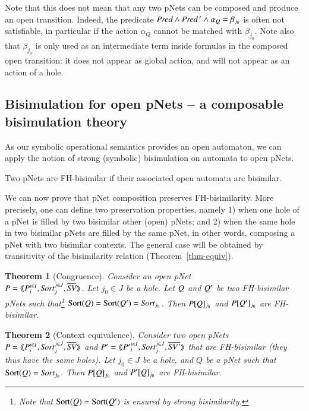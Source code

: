 \documentclass{elsarticle}
\newcommand{\TODO}[1]{\textcolor{red}{\textbf{[TODO:#1]}}}
\newtheorem{thm}{Theorem}
\begin{document}
Note that this does not mean that any two pNets can be composed and produce an open 
transition. Indeed, the predicate $\Pred\land\Pred\,'\land \alpha_Q=\beta_{j_0}$ is often not  satisfiable, in particular if the action  $\alpha_Q$ cannot be matched with $\beta_{j_0}$.
Note also that $\beta_{j_0}$ is  only used as an intermediate term inside formulas in the composed open transition: it 
does not appear as global action, and will not appear as an action of a hole.


\subsection{Bisimulation for open pNets -- a composable bisimulation theory}
\label{section:bisimulation-PN}
As  our symbolic operational semantics provides an open automaton, we can apply the notion of
	strong (symbolic) bisimulation on automata to open pNets.
\begin{definition}\label{def:bisim-pnets}
Two pNets are FH-bisimilar if their associated open automata are bisimilar.
\end{definition}

We can now prove that pNet composition  preserves
FH-bisimilarity. More precisely, one can define two preservation
properties, namely 1) when one hole of a pNet is filled by two bisimilar other (open) pNets; and 2) when the same hole in two bisimilar pNets are
filled by the same pNet, in other words, composing a pNet with two
bisimilar contexts. The general case will be obtained by
transitivity of the bisimilarity relation (Theorem~\ref{thm-equiv}). 

\begin{thm}[Congruence]\label{thm-congr-eq}
	Consider an open pNet \\
	$\pNet = \mylangle \pNet_i^{i\in I}, \Sort_j^{j\in J}, 
	\set{\symb{SV}}\myrangle$.
	Let $j_0\in J$ be a hole. Let $Q$ and $Q'$ be two FH-bisimilar pNets such that\footnote{Note that $\operatorname{Sort}(Q)=\operatorname{Sort}(Q')$ is 
	ensured by 
	strong bisimilarity.} 
	$\Sortop(\pNetQ)=\Sortop(\pNetQ')=\Sort_{j_0}$. Then 
	$P[Q]_{j_0}$ and 
	$P[Q']_{j_0}$ are FH-bisimilar.
\end{thm}
 
 
\begin{thm}[Context equivalence]\label{thm-ctxt-eq}
	Consider two  open pNets\\
	$\pNet = \mylangle \pNet_i^{i\in I}, \Sort_j^{j\in J}, 
	\set{\symb{SV}}\myrangle$ and 	$\pNet' = \mylangle {\pNet'}_i^{i\in I}, 
	\Sort_j^{j\in 
	J}, 	\set{\symb{SV'}}\myrangle$ that are FH-bisimilar
	(they thus have the same holes).
	Let $j_0\in J$ be a hole, and $Q$ be a pNet such that $\Sortop(Q)=\Sort_{j_0}$. Then 
	$P[Q]_{j_0}$ and 
	$P'[Q]_{j_0}$ are FH-bisimilar.
\end{thm}
\end{document}
